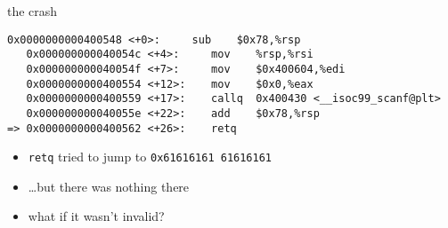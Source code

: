 
\begin{frame}[fragile,label=theCrash]{the crash}
\begin{Verbatim}[fontsize=\fontsize{9}{10}\selectfont,commandchars=\\\[\]]
   0x0000000000400548 <+0>:     sub    $0x78,%rsp
   0x000000000040054c <+4>:     mov    %rsp,%rsi
   0x000000000040054f <+7>:     mov    $0x400604,%edi
   0x0000000000400554 <+12>:    mov    $0x0,%eax
   0x0000000000400559 <+17>:    callq  0x400430 <__isoc99_scanf@plt>
   0x000000000040055e <+22>:    add    $0x78,%rsp
=> 0x0000000000400562 <+26>:    retq   
\end{Verbatim}
\begin{itemize}
\item {\tt retq} tried to jump to {\tt 0x61616161 61616161}
\item \ldots but there was nothing there
\item<2-> what if it wasn't invalid?
\end{itemize}
\end{frame}


